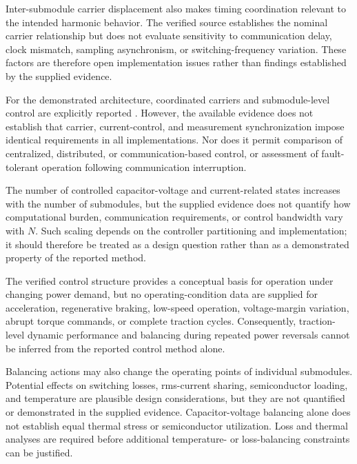 Inter-submodule carrier displacement also makes timing coordination relevant to the intended harmonic behavior. The verified source establishes the nominal carrier relationship but does not evaluate sensitivity to communication delay, clock mismatch, sampling asynchronism, or switching-frequency variation. These factors are therefore open implementation issues rather than findings established by the supplied evidence. %

For the demonstrated architecture, coordinated carriers and submodule-level control are explicitly reported \cite{Jin2017}. However, the available evidence does not establish that carrier, current-control, and measurement synchronization impose identical requirements in all implementations. Nor does it permit comparison of centralized, distributed, or communication-based control, or assessment of fault-tolerant operation following communication interruption. %

The number of controlled capacitor-voltage and current-related states increases with the number of submodules, but the supplied evidence does not quantify how computational burden, communication requirements, or control bandwidth vary with \(N\). Such scaling depends on the controller partitioning and implementation; it should therefore be treated as a design question rather than as a demonstrated property of the reported method. %

The verified control structure provides a conceptual basis for operation under changing power demand, but no operating-condition data are supplied for acceleration, regenerative braking, low-speed operation, voltage-margin variation, abrupt torque commands, or complete traction cycles. Consequently, traction-level dynamic performance and balancing during repeated power reversals cannot be inferred from the reported control method alone. %

Balancing actions may also change the operating points of individual submodules. Potential effects on switching losses, rms-current sharing, semiconductor loading, and temperature are plausible design considerations, but they are not quantified or demonstrated in the supplied evidence. Capacitor-voltage balancing alone does not establish equal thermal stress or semiconductor utilization. Loss and thermal analyses are required before additional temperature- or loss-balancing constraints can be justified. %

